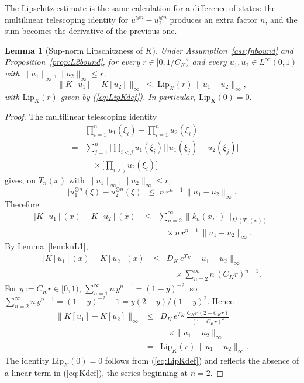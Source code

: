\documentclass[10pt,a4paper]{amsart}
\newtheorem{lemma}{Lemma}
\newcommand{\Linf}{L^\infty}
\newcommand{\Lipk}{\mathrm{Lip}_K}
\begin{document}
The Lipschitz estimate is the same calculation for a difference of states: the multilinear telescoping identity for $u_1^{\otimes n} - u_2^{\otimes n}$ produces an extra factor $n$, and the sum becomes the derivative of the previous one.

\begin{lemma}[Sup-norm Lipschitzness of $K$]\label{lem:KLip}
Under Assumption~\ref{ass:fnbound} and Proposition~\ref{prop:L2bound}, for every $r \in [0, 1/C_K)$ and every $u_1, u_2 \in \Linf(0,1)$ with $\|u_1\|_\infty, \|u_2\|_\infty \le r$,
\begin{equation}
\|K[u_1] - K[u_2]\|_\infty \;\le\; \Lipk(r)\,\|u_1 - u_2\|_\infty,
\label{eq:KLip}
\end{equation}
with $\Lipk(r)$ given by (\ref{eq:LipKdef}). In particular, $\Lipk(0) = 0$.
\end{lemma}

\begin{proof}
The multilinear telescoping identity
\begin{eqnarray}
&& \prod_{i=1}^n u_1(\xi_i) - \prod_{i=1}^n u_2(\xi_i) \nonumber \\
&=& \sum_{j=1}^n \biggl[\prod_{i<j} u_1(\xi_i)\biggr]\,\bigl[u_1(\xi_j) - u_2(\xi_j)\bigr] \nonumber \\
&& \quad \times \biggl[\prod_{i>j} u_2(\xi_i)\biggr]
\label{eq:telescope}
\end{eqnarray}
gives, on $T_n(x)$ with $\|u_1\|_\infty, \|u_2\|_\infty \le r$,
\begin{equation}
\bigl|u_1^{\otimes n}(\xi) - u_2^{\otimes n}(\xi)\bigr| \;\le\; n\, r^{n-1}\, \|u_1 - u_2\|_\infty.
\label{eq:telescope_bound}
\end{equation}
Therefore
\begin{eqnarray}
|K[u_1](x) - K[u_2](x)| &\le& \sum_{n=2}^\infty \|k_n(x,\cdot)\|_{L^1(T_n(x))} \nonumber \\
&& \quad \times n\, r^{n-1}\, \|u_1 - u_2\|_\infty.
\label{eq:K1K2_sum}
\end{eqnarray}
By Lemma~\ref{lem:knL1},
\begin{eqnarray}
|K[u_1](x) - K[u_2](x)| &\le& D_K\, e^{\Upsilon_K}\, \|u_1 - u_2\|_\infty \nonumber \\
&& \quad \times \sum_{n=2}^\infty n\, (C_K r)^{n-1}.
\label{eq:K1K2_applied}
\end{eqnarray}
For $y := C_K r \in [0,1)$, $\sum_{n=1}^\infty n\, y^{n-1} = (1-y)^{-2}$, so $\sum_{n=2}^\infty n\, y^{n-1} = (1-y)^{-2} - 1 = y(2-y)/(1-y)^2$. Hence
\begin{eqnarray}
\|K[u_1] - K[u_2]\|_\infty &\le& D_K\, e^{\Upsilon_K}\, \frac{C_K r\,(2 - C_K r)}{(1 - C_K r)^2} \nonumber \\
&& \quad \times \|u_1 - u_2\|_\infty \nonumber \\
&=& \Lipk(r)\,\|u_1 - u_2\|_\infty.
\label{eq:K1K2_final}
\end{eqnarray}
The identity $\Lipk(0) = 0$ follows from (\ref{eq:LipKdef}) and reflects the absence of a linear term in (\ref{eq:Kdef}), the series beginning at $n=2$.
\end{proof}
\end{document}
